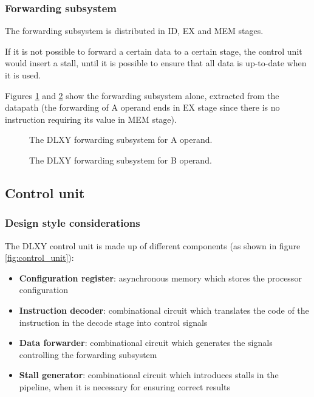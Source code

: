 \subsubsection{Forwarding subsystem}
The forwarding subsystem is distributed in ID, EX and MEM stages.

If it is not possible to forward a certain data to a certain stage, the control
unit would insert a stall, until it is possible to ensure that all data is
up-to-date when it is used.

Figures \ref{fig:fwd_a} and \ref{fig:fwd_b} show the forwarding subsystem alone,
extracted from the datapath (the forwarding of A operand ends in EX stage since
there is no instruction requiring its value in MEM stage).
\begin{figure}[H]
	\centering
	\caption{The DLXY forwarding subsystem for A operand.}
	\label{fig:fwd_a}
\end{figure}
\begin{figure}[H]
	\centering
	\caption{The DLXY forwarding subsystem for B operand.}
	\label{fig:fwd_b}
\end{figure}

\subsection{Control unit}
\subsubsection{Design style considerations}
The DLXY control unit is made up of different components (as shown in figure
\ref{fig:control_unit}):
\begin{itemize}
	\item \textbf{Configuration register}: asynchronous memory which stores
		the processor configuration
	\item \textbf{Instruction decoder}: combinational circuit which translates
		the code of the instruction in the decode stage into control signals
	\item \textbf{Data forwarder}: combinational circuit which generates the
		signals controlling the forwarding subsystem
	\item \textbf{Stall generator}: combinational circuit which introduces
		stalls in the pipeline, when it is necessary for ensuring
		correct results
\end{itemize}


